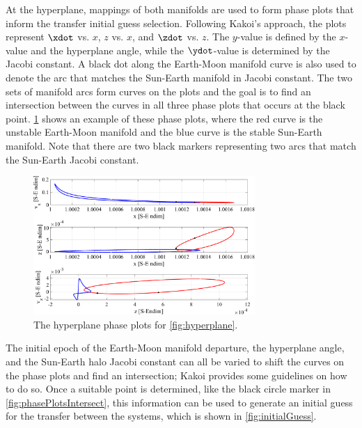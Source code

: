 At the hyperplane, mappings of both manifolds are used to form phase plots that inform the transfer
initial guess selection. Following Kakoi's approach, the plots represent $\xdot$ vs. $x$, $z$ vs.
$x$, and $\zdot$ vs. $z$. The $y$-value is defined by the $x$-value and the hyperplane angle, while
the $\ydot$-value is determined by the Jacobi constant\cite{Kakoi:2015}. A black dot along the
Earth-Moon manifold curve is also used to denote the arc that matches the Sun-Earth manifold in
Jacobi constant. The two sets of manifold arcs form curves on the plots and the goal is to find an
intersection between the curves in all three phase plots that occurs at the black point.
\cref{fig:phasePlots} shows an example of these phase plots, where the red curve is the unstable
Earth-Moon manifold and the blue curve is the stable Sun-Earth manifold. Note that there are two
black markers representing two arcs that match the Sun-Earth Jacobi constant.

\begin{figure}[ht]
    \centering
    \includegraphics[width=0.75\textwidth]{figures/PhasePlots.pdf}
    \caption{The hyperplane phase plots for \cref{fig:hyperplane}.}
    \label{fig:phasePlots}
\end{figure}

The initial epoch of the Earth-Moon manifold departure, the hyperplane angle, and the Sun-Earth
halo Jacobi constant can all be varied to shift the curves on the phase plots and find an
intersection; Kakoi provides some guidelines on how to do so\cite{Kakoi:2015}. Once a suitable
point is determined, like the black circle marker in \cref{fig:phasePlotsIntersect}, this
information can be used to generate an initial guess for the transfer between the systems, which is
shown in \cref{fig:initialGuess}.

